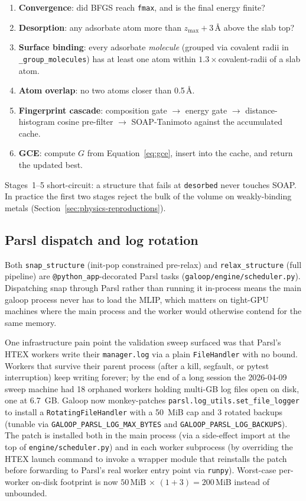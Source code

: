 \documentclass[11pt,letterpaper]{article}
\begin{document}
\begin{enumerate}
  \item \textbf{Convergence}: did BFGS reach \texttt{fmax}, and is the
    final energy finite?
  \item \textbf{Desorption}: any adsorbate atom more than
    $z_{\max}+3$\,\AA{} above the slab top?
  \item \textbf{Surface binding}: every adsorbate \emph{molecule}
    (grouped via covalent radii in
    \texttt{\_group\_molecules}) has at least one atom within
    $1.3\times$covalent-radii of a slab atom.
  \item \textbf{Atom overlap}: no two atoms closer than 0.5\,\AA{}.
  \item \textbf{Fingerprint cascade}: composition gate $\to$ energy
    gate $\to$ distance-histogram cosine pre-filter $\to$
    SOAP-Tanimoto against the accumulated cache.
  \item \textbf{GCE}: compute $G$ from Equation~\ref{eq:gce}, insert
    into the cache, and return the updated best.
\end{enumerate}

Stages~1--5 short-circuit: a structure that fails at \texttt{desorbed}
never touches SOAP. In practice the first two stages reject the bulk
of the volume on weakly-binding metals
(Section~\ref{sec:physics-reproductions}).

\subsection{Parsl dispatch and log rotation}

Both \texttt{snap\_structure} (init-pop constrained pre-relax) and
\texttt{relax\_structure} (full pipeline) are
\texttt{@python\_app}-decorated Parsl tasks
(\texttt{galoop/engine/scheduler.py}). Dispatching snap through Parsl
rather than running it in-process means the main galoop process
never has to load the MLIP, which matters on tight-GPU machines where
the main process and the worker would otherwise contend for the same
memory.

One infrastructure pain point the validation sweep surfaced was that
Parsl's HTEX workers write their \texttt{manager.log} via a plain
\texttt{FileHandler} with no bound. Workers that survive their parent
process (after a kill, segfault, or pytest interruption) keep writing
forever; by the end of a long session the 2026-04-09 sweep machine
had 18 orphaned workers holding multi-GB log files open on disk, one
at 6.7~GB. Galoop now monkey-patches
\texttt{parsl.log\_utils.set\_file\_logger} to install a
\texttt{RotatingFileHandler} with a 50~MiB cap and 3 rotated backups
(tunable via \texttt{GALOOP\_PARSL\_LOG\_MAX\_BYTES} and
\texttt{GALOOP\_PARSL\_LOG\_BACKUPS}). The patch is installed both
in the main process (via a side-effect import at the top of
\texttt{engine/scheduler.py}) and in each worker subprocess (by
overriding the HTEX launch command to invoke a wrapper module that
reinstalls the patch before forwarding to Parsl's real worker entry
point via \texttt{runpy}). Worst-case per-worker on-disk footprint is
now $50\,\text{MiB}\,\times\,(1+3) = 200$\,MiB instead of unbounded.
\end{document}
